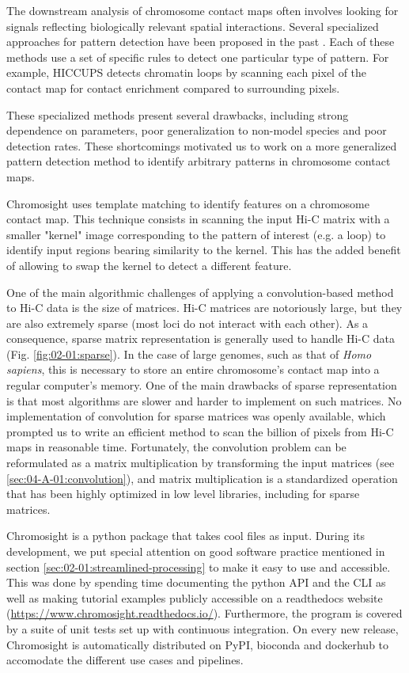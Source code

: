 The downstream analysis of chromosome contact maps often involves looking for signals reflecting biologically relevant spatial interactions. Several specialized approaches for pattern detection have been proposed in the past \cite{sergeyvenevOpen2cCooltoolsV02021,wolffLoopDetectionUsing2020,rao3DMapHuman2014}. Each of these methods use a set of specific rules to detect one particular type of pattern. For example, HICCUPS \cite{rao3DMapHuman2014} detects chromatin loops by scanning each pixel of the contact map for contact enrichment compared to surrounding pixels.

These specialized methods present several drawbacks, including strong dependence on parameters, poor generalization to non-model species and poor detection rates. These shortcomings motivated us to work on a more generalized pattern detection method to identify arbitrary patterns in chromosome contact maps.

Chromosight uses template matching to identify features on a chromosome contact map. This technique consists in scanning the input Hi-C matrix with a smaller "kernel" image corresponding to the pattern of interest (e.g. a loop) to identify input regions bearing similarity to the kernel. This has the added benefit of allowing to swap the kernel to detect a different feature.

One of the main algorithmic challenges of applying a convolution-based method to Hi-C data is the size of matrices. Hi-C matrices are notoriously large, but they are also extremely sparse (most loci do not interact with each other). As a consequence, sparse matrix representation is generally used to handle Hi-C data (Fig. \ref{fig:02-01:sparse}). In the case of large genomes, such as that of \textit{Homo sapiens}, this is necessary to store an entire chromosome's contact map into a regular computer's memory. One of the main drawbacks of sparse representation is that most algorithms are slower and harder to implement on such matrices. No implementation of convolution for sparse matrices was openly available, which prompted us to write an efficient method to scan the billion of pixels from Hi-C maps in reasonable time. Fortunately, the convolution problem can be reformulated as a matrix multiplication by transforming the input matrices (see \ref{sec:04-A-01:convolution}), and matrix multiplication is a standardized operation that has been highly optimized in low level libraries, including for sparse matrices.

Chromosight is a python package that takes cool files as input. During its development, we put special attention on good software practice mentioned in section \ref{sec:02-01:streamlined-processing} to make it easy to use and accessible. This was done by spending time documenting the python \acrshort{API} and the \acrshort{CLI} as well as making tutorial examples publicly accessible on a readthedocs website (\url{https://www.chromosight.readthedocs.io/}). Furthermore, the program is covered by a suite of unit tests set up with continuous integration. On every new release, Chromosight is automatically distributed on PyPI, bioconda and dockerhub to accomodate the different use cases and pipelines.

